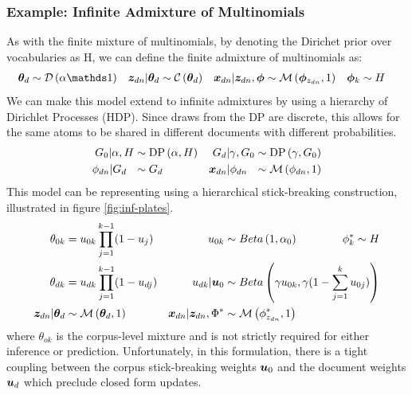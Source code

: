\subsubsection*{Example: Infinite Admixture of Multinomials}
As with the finite mixture of multinomials, by denoting the Dirichet prior over vocabularies as H, we can define the finite admixture of multinomials as:
\begin{align}
\thd & \sim \dir{\alpha \one} &
\zdn|\thd & \sim \cat{\thd} & 
\xdn|\zdn, \param & \sim \muln{\param_{z_{dn}}}{1} & 
\param_k & \sim H
\end{align}
We can make this model extend to infinite admixtures by using a hierarchy of Dirichlet Processes (HDP)\cite{Teh2006b}. Since draws from the DP are discrete, this allows for the same atoms to be shared in different documents with different probabilities.
\begin{align}
G_0|\alpha, H & \sim \text{DP} \left( {\alpha, H} \right) &
G_d|\gamma, G_0 & \sim \text{DP} \left( {\gamma, G_0} \right) \\
\phi_{dn}|G_d\text{ }\text{ } &\sim G_d &
{ \bm x_{dn} }|\phi_{dn}\text{ }\text{ } & \sim \mathcal{M} \left( {\phi_{dn}},{1} \right)
\end{align}
This model can be representing using a hierarchical stick-breaking construction, illustrated in figure \ref{fig:inf-plates}.
\begin{align}
\theta_{0k} & = u_{0k} \prod_{j=1}^{k-1}(1-u_j) &
u_{0k} & \sim Beta \left( {1}, {\alpha_0} \right) \qquad\qquad
\phi^*_k \sim H \\
\theta_{dk} &= u_{dk} \prod_{j=1}^{k-1}(1 - u_{dj}) &
u_{dk}|\bm u_{0} & \sim Beta \left( {\gamma u_{0k}}, {\gamma ( 1 - \sum_{j=1}^{k} u_{0j} )} \right) \\
{ \bm z_{dn} } | { \bm \theta_d } & \sim \mathcal{M} \left( {{ \bm \theta_d }},{1} \right) &
{ \bm x_{dn} } | { \bm z_{dn} }, \Phi^* &\sim \mathcal{M} \left( {\phi^*_{z_{dn}}},{1} \right)
\end{align}
where $\theta_{ok}$ is the corpus-level mixture and is not strictly required for either inference or prediction. Unfortunately, in this formulation, there is a tight coupling between the corpus stick-breaking weights $\bm u_0$ and the document weights $\bm u_d$ which preclude closed form updates.

